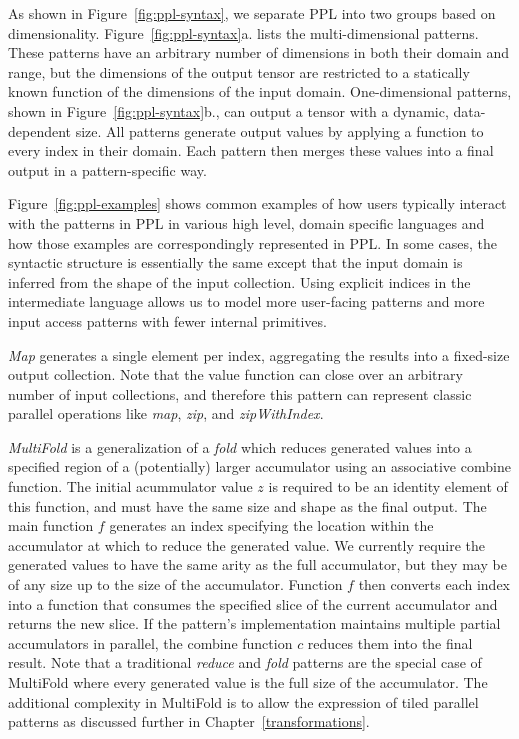 As shown in Figure~\ref{fig:ppl-syntax}, we separate PPL into two groups based on dimensionality.
Figure~\ref{fig:ppl-syntax}a. lists the multi-dimensional patterns.
These patterns have an arbitrary number of dimensions in both their domain and range,
but the dimensions of the output tensor
are restricted to a statically known function of the dimensions of the input domain.
One-dimensional patterns, shown in Figure~\ref{fig:ppl-syntax}b., can output a tensor with a dynamic, data-dependent size.
All patterns generate output values by applying a function to
every index in their domain. Each pattern then merges these values into a final
output in a pattern-specific way.



Figure~\ref{fig:ppl-examples} shows common examples of how users typically interact with
the patterns in PPL in various high level, domain specific languages
and how those examples are correspondingly represented in PPL. In some cases, the syntactic structure is
essentially the same except that the input domain is inferred from the shape of
the input collection. Using explicit indices in the intermediate language allows
us to model more user-facing patterns and more input access patterns with fewer internal primitives.

\emph{Map} generates a single element per index, aggregating the results into a fixed-size output collection.
Note that the value function can close over an arbitrary number of input collections, and therefore this pattern can represent classic parallel operations like \emph{map}, \emph{zip},
and \emph{zipWithIndex}.

\emph{MultiFold} is a generalization of a \emph{fold} which reduces generated values into a specified region of a (potentially) larger accumulator using an associative combine function.
The initial acummulator value $z$ is required to be an identity element of this function, and must have the same size and shape as the final output.
The main function $f$ generates an index specifying the location within the accumulator at which to reduce the generated value. We currently require the generated values to have the same arity as the full accumulator, but they may be of any size up to the size of the accumulator.
Function $f$ then converts each index into a function that consumes the specified
slice of the current accumulator and returns the new slice. If the pattern's
implementation maintains multiple partial accumulators in parallel, the combine
function $c$ reduces them into the final result.
Note that a traditional \emph{reduce} and \emph{fold} patterns are the special
case of MultiFold where every generated value is the full size of the accumulator.
The additional complexity in MultiFold is to allow the expression of tiled
parallel patterns as discussed further in Chapter~\ref{transformations}.

